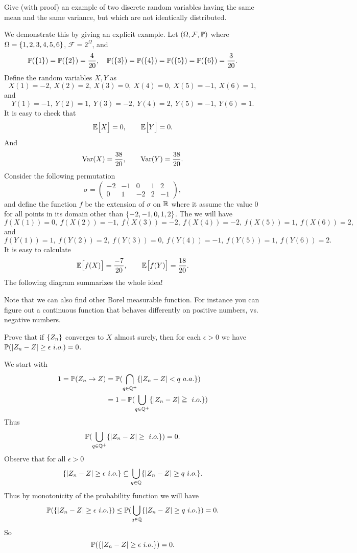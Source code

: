\begin{problem}
	Give (with proof) an example of two discrete random variables having the same mean and the same variance, but which are not identically distributed.
\end{problem}
\begin{solution}
	We demonstrate this by giving an explicit example. Let $ (\Omega,\mathcal{F},\mathbb{P}) $ where $ \Omega = \{1,2,3,4,5,6\} $, $ \mathcal{F} = 2^\Omega $, and
	\[ \mathbb{P}(\{1\})=\mathbb{P}(\{2\})=\frac{4}{20},\quad \mathbb{P}(\{3\})=\mathbb{P}(\{4\})=\mathbb{P}(\{5\})=\mathbb{P}(\{6\})=\frac{3}{20}. \]
	Define the random variables $ X,Y $ as
	\[ X(1)=-2,\ X(2)=2,\ X(3)=0,\ X(4)=0,\ X(5)=-1,\ X(6)=1, \]
	and
	\[ Y(1)=-1,\ Y(2)=1,\ Y(3)=-2,\ Y(4)=2,\ Y(5)=-1,\ Y(6)=1. \]
	It is easy to check that
	\[ \mathbb{E}\big[X\big] = 0, \qquad \mathbb{E}\big[Y\big] = 0. \]
	And
	\[ \operatorname{Var}(X) = \frac{38}{20},\qquad \operatorname{Var}(Y) = \frac{38}{20}. \]
	Consider the following permutation
	\[ 
	\sigma = \begin{pmatrix}
		-2 & -1 & 0 & 1 & 2 \\
		0 & 1 & -2 & 2 & -1
	\end{pmatrix},
	 \]
	 and define the function $ f $ be the extension of $ \sigma $ on $ \mathbb{R} $ where it assume the value 0 for all points in its domain other than $ \{-2,-1,0,1,2\} $. The we will have
	 \[ f(X(1))=0,\ f(X(2))=-1,\ f(X(3))=-2,\ f(X(4))=-2,\ f(X(5))=1,\ f(X(6))=2, \]
	 and
	 \[ f(Y(1))=1,\ f(Y(2))=2,\ f(Y(3))=0,\ f(Y(4))=-1,\ f(Y(5))=1,\ f(Y(6))=2. \]
	 It is easy to calculate
	 \[ \mathbb{E}\big[f(X)\big] = \frac{-7}{20},\qquad \mathbb{E}\big[f(Y)\big] = \frac{18}{20}. \]
	 The following diagram summarizes the whole idea!
	 
	 Note that we can also find other Borel measurable function. For instance you can figure out a continuous function that behaves differently on positive numbers, vs. negative numbers.
\end{solution}

\begin{problem}
	Prove that if $ \{Z_n\} $ converges to $ X $ almost surely, then for each $ \epsilon>0 $ we have $ \prob(\abs{Z_n - Z}\geq \epsilon\ i.o.) = 0 $.
\end{problem}
\begin{solution}
	We start with
	\begin{align*}
		1 = \mathbb{P}(Z_n\to Z) &= \mathbb{P}(\bigcap_{q\in\mathbb{Q}^+}\{|Z_n-Z|<q\ a.a.\}) \\
		&= 1 - \mathbb{P}(\bigcup_{q\in\mathbb{Q}^+}\{|Z_n-Z|\geqq\ i.o.\})
	\end{align*}
	Thus
	\[ \prob(\bigcup_{q\in\Q^+}\set{\abs{Z_n-Z}\geq\ i.o.}) = 0. \]
	Observe that for all $ \epsilon>0 $
	\[ \{|Z_n-Z|\geq\epsilon\ i.o.\} \subseteq \bigcup_{q\in\mathbb{Q}}\{|Z_n-Z|\geq q\ i.o.\}. \]
	Thus by monotonicity of the probability function we will have
	\[ \mathbb{P}(\{|Z_n-Z|\geq\epsilon\ i.o.\}) \leq \mathbb{P}(\bigcup_{q\in\mathbb{Q}}\{|Z_n-Z|\geq q\ i.o.\}) = 0. \]
	So
	\[  \mathbb{P}(\{|Z_n-Z|\geq\epsilon\ i.o.\}) = 0. \]
\end{solution}


